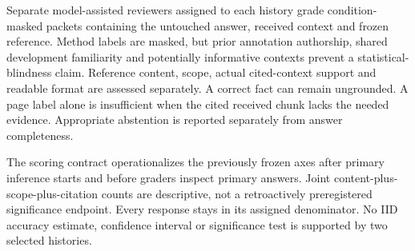 \documentclass[11pt]{article}
\begin{document}
Separate model-assisted reviewers assigned to each history grade condition-masked packets containing the untouched answer, received context and frozen reference. Method labels are masked, but prior annotation authorship, shared development familiarity and potentially informative contexts prevent a statistical-blindness claim. Reference content, scope, actual cited-context support and readable format are assessed separately. A correct fact can remain ungrounded. A page label alone is insufficient when the cited received chunk lacks the needed evidence. Appropriate abstention is reported separately from answer completeness.

The scoring contract operationalizes the previously frozen axes after primary inference starts and before graders inspect primary answers. Joint content-plus-scope-plus-citation counts are descriptive, not a retroactively preregistered significance endpoint. Every response stays in its assigned denominator. No IID accuracy estimate, confidence interval or significance test is supported by two selected histories.
\end{document}
